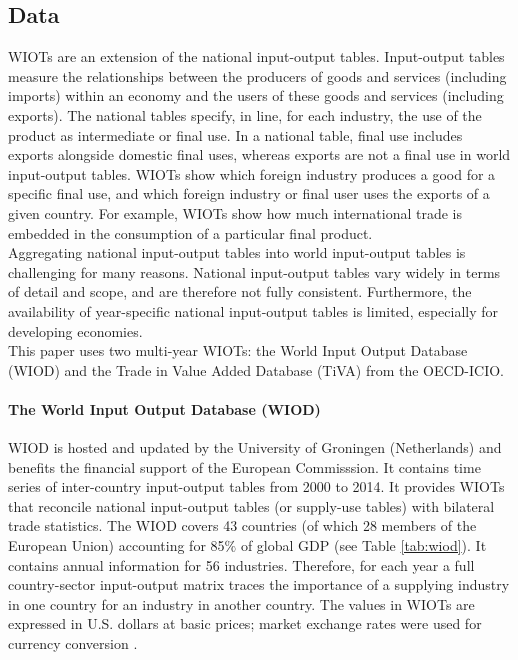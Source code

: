 \documentclass[11pt,a4paper]{article}
\begin{document}
\subsection{Data}
\label{subsec:data}

WIOTs are an extension of the national input-output tables. 
Input-output tables measure the relationships between the producers of goods and services (including imports) within an economy and the users of these goods and services (including exports). The national tables specify, in line, for each industry, the use of the product as intermediate or final use. 
In a national table, final use includes exports alongside domestic final uses, whereas exports are not a final use in world input-output tables. 
WIOTs show which foreign industry produces a good for a specific final use, and which foreign industry or final user uses the exports of a given country. 
For example, WIOTs show how much international trade is embedded in the consumption of a particular final product. \\
Aggregating national input-output tables into world input-output tables is challenging for many reasons. National input-output tables vary widely in terms of detail and scope, and are therefore not fully consistent. Furthermore, the availability of year-specific national input-output tables is limited, especially for developing economies.  \\
This paper uses two multi-year WIOTs: the World Input Output Database (WIOD) and the Trade in Value Added Database (TiVA) from the OECD-ICIO.

\paragraph{The World Input Output Database (WIOD)}
WIOD is hosted and updated by the University of Groningen (Netherlands) and benefits the financial support of the European Commisssion. It contains time series of inter-country input-output tables from 2000 to 2014. 
It provides WIOTs that reconcile national input-output tables (or supply-use tables) with bilateral trade statistics.
The WIOD covers 43 countries (of which 28 members of the European Union) accounting for 85$\%$ of global GDP (see Table \ref{tab:wiod}). 
It contains annual information for 56 industries. Therefore, for each year a full country-sector input-output matrix traces the importance of a supplying industry in one country for an industry in another country. The values in WIOTs are expressed in U.S. dollars at basic prices; market exchange rates were used for currency conversion \citep{Timmer2015}. 
\end{document}
